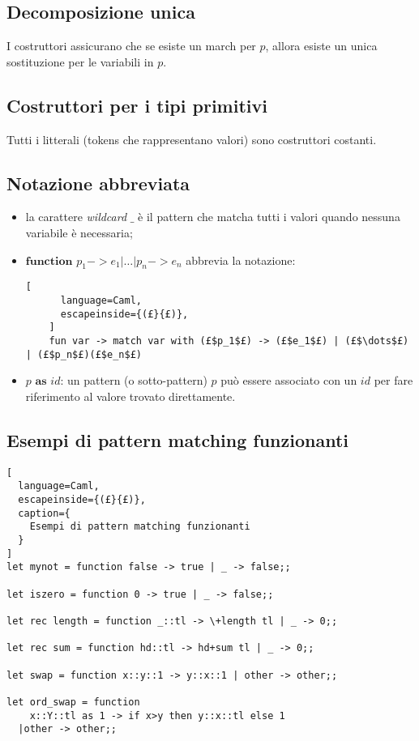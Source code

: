 \subsection{Decomposizione unica}
I costruttori assicurano che se esiste un march per $p$, allora esiste un unica sostituzione per le variabili in $p$.

\subsection{Costruttori per i tipi primitivi}
Tutti i litterali (tokens che rappresentano valori) sono costruttori costanti.

\subsection{Notazione abbreviata}
\begin{itemize}
  \item la carattere \textit{wildcard} $\_$ è il pattern che matcha tutti i
    valori quando nessuna variabile è necessaria;
  \item $\textbf{function } p_1->e_1|\dots|p_n->e_n$ abbrevia la notazione:
    \begin{lstlisting}[
      language=Caml,
      escapeinside={(£}{£)},
    ]
    fun var -> match var with (£$p_1$£) -> (£$e_1$£) | (£$\dots$£) | (£$p_n$£)(£$e_n$£)
    \end{lstlisting}
  \item $p \textbf{ as } id$: un pattern (o sotto-pattern) $p$ può essere
    associato con un $id$ per fare riferimento al valore trovato direttamente.
\end{itemize}

\subsection{Esempi di pattern matching funzionanti}
\begin{lstlisting}[
  language=Caml,
  escapeinside={(£}{£)},
  caption={
    Esempi di pattern matching funzionanti
  }
]
let mynot = function false -> true | _ -> false;;

let iszero = function 0 -> true | _ -> false;;

let rec length = function _::tl -> \+length tl | _ -> 0;;

let rec sum = function hd::tl -> hd+sum tl | _ -> 0;;

let swap = function x::y::1 -> y::x::1 | other -> other;;

let ord_swap = function
    x::Y::tl as 1 -> if x>y then y::x::tl else 1
  |other -> other;;
\end{lstlisting}

